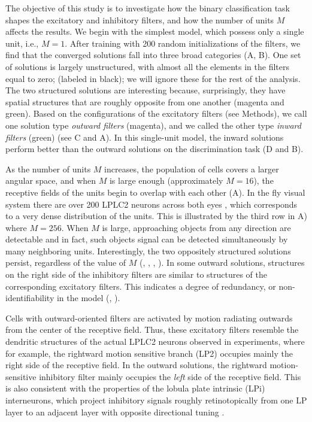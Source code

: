 \documentclass[pdftex,9pt,lineno]{elife}
\begin{document}
The objective of this study is to investigate how the binary classification task shapes the excitatory and inhibitory filters, and how the number of units $M$ affects the results. We begin with the simplest model, which possess only a single unit, i.e., $M=1$. After training with 200 random initializations of the filters, we find that the converged solutions fall into three broad categories (A, B). One set of solutions is largely unstructured, with almost all the elements in the filters equal to zero; (labeled in black); we will ignore these for the rest of the analysis. The two structured solutions are interesting because, surprisingly, they have  spatial structures that are roughly opposite from one another (magenta and green). Based on the configurations of the excitatory filters (see Methods), we call one solution type \textit{outward filters}   (magenta), and we called the other type \textit{inward filters} (green) (see C and A). In this single-unit model, the inward solutions perform better than the outward solutions on the discrimination task (D and B).

As the number of units $M$ increases, the population of cells covers a larger angular space, and when $M$ is large enough (approximately $M=16$), the receptive fields of the units begin to overlap with each other (A). In the fly visual system there are over 200 LPLC2 neurons across both eyes \citep{ache2019neural}, which corresponds to a very dense distribution of the units. This is illustrated by the third row in A) where $M=256$. When $M$ is large, approaching objects from any direction are detectable and in fact, such objects signal can be detected simultaneously by many neighboring units. Interestingly, the two oppositely structured solutions persist, regardless of the value of $M$ (,  , ,  ). In some outward solutions, structures on the right side of the inhibitory filters are similar to structures of the corresponding excitatory filters. This indicates a degree of redundancy, or non-identifiability in the model (, ).

Cells with outward-oriented filters are activated by motion radiating outwards from the center of the receptive field. Thus, these excitatory filters resemble the dendritic structures of the actual LPLC2 neurons observed in experiments, where for example, the rightward motion sensitive branch (LP2) occupies mainly the right side of the receptive field. In the outward solutions, the rightward motion-sensitive inhibitory filter mainly occupies the \textit{left} side of the receptive field. This is also consistent with the properties of the lobula plate intrinsic (LPi) interneurons, which project inhibitory signals roughly retinotopically from one LP layer to an adjacent layer with opposite directional tuning \citep{mauss2015neural,klapoetke2017ultra}.
\end{document}
